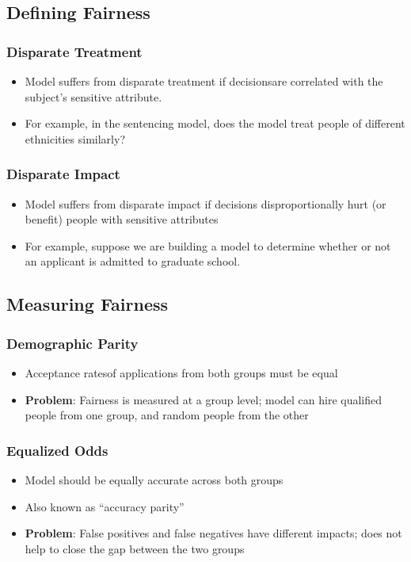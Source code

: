 \documentclass[11pt]{article}
\begin{document}
\subsection{Defining Fairness}
\subsubsection{Disparate Treatment }
\begin{itemize}
\item Model suffers from disparate treatment if decisionsare correlated with the subject’s sensitive attribute.
\item For example, in the sentencing model, does the model treat people of different ethnicities similarly?
\end{itemize}
\subsubsection{Disparate Impact}
\begin{itemize}
\item Model suffers from disparate impact if decisions disproportionally hurt (or benefit) people with sensitive attributes
\item For example, suppose we are building a model to determine whether or not an applicant is admitted to graduate school.
\end{itemize}

\subsection{Measuring Fairness }
\subsubsection{Demographic Parity }
\begin{itemize}
\item Acceptance ratesof applications from both groups must be equal
\item \textbf{Problem}: Fairness is measured at a group level; 
model can hire qualified people from one group, and random people from the other
\end{itemize}
\subsubsection{Equalized Odds }
\begin{itemize}
\item Model should be equally accurate across both groups
\item Also known as “accuracy parity”
\item \textbf{Problem}: False positives and false negatives have different impacts; does not help to close the gap between the two groups
\end{itemize}
\end{document}
